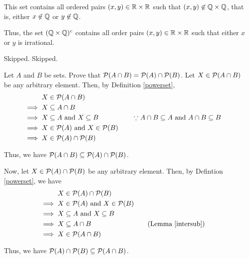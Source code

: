\bs This set contains all ordered pairs $(x, y) \in \mathbb{R} \times \mathbb{R}$ such that $(x, y) \not\in \mathbb{Q} \times \mathbb{Q}$, that is, either $x \not\in \mathbb{Q}$ or $y \not\in \mathbb{Q}$.

Thus, the set $(\mathbb{Q} \times \mathbb{Q})^c$ contains all order pairs $(x,y) \in \mathbb{R}\times\mathbb{R}$ such that either $x$ or $y$ is irrational.
\es

\bp Skipped. \ep
\bp Skipped. \ep

\bp Let $A$ and $B$ be sets. Prove that $\mathcal{P}(A \cap B) = \mathcal{P}(A) \cap \mathcal{P}(B)$. \ep
\bs
Let $X \in \mathcal{P}(A \cap B)$ be any arbitrary element. Then, by Definition \ref{powerset},
\begin{align*}
	X          & \in \mathcal{P}(A \cap B)                                                                                               \\
	\implies X & \subseteq A \cap B                                                                                                 \\
	\implies X & \subseteq A \text{ and } X \subseteq B
	           &                                            & \quad \because A \cap B \subseteq A \text{ and } A \cap B \subseteq B \\
	\implies X & \in \mathcal{P}(A) \text{ and } X \in \mathcal{P}(B)                                                                         \\
	\implies X & \in \mathcal{P}(A) \cap \mathcal{P}(B)
\end{align*}

Thus, we have $\mathcal{P}(A \cap B) \subseteq \mathcal{P}(A) \cap \mathcal{P}(B)$.

Now, let $X \in \mathcal{P}(A) \cap \mathcal{P}(B)$ be any arbitrary element. Then, by Defintion \ref{powerset}, we  have
\begin{align*}
	X          & \in \mathcal{P}(A) \cap \mathcal{P}(B)                                                        \\
	\implies X & \in \mathcal{P}(A) \text{ and } X \in \mathcal{P}(B)                                          \\
	\implies X & \subseteq A \text{ and } X \subseteq B                                            \\
	\implies X & \subseteq A \cap B                       &  & \quad \text{(Lemma \ref{intersub})} \\
	\implies X & \in \mathcal{P}(A \cap B)
\end{align*}

Thus, we have $\mathcal{P}(A) \cap \mathcal{P}(B) \subseteq \mathcal{P}(A \cap B)$.

